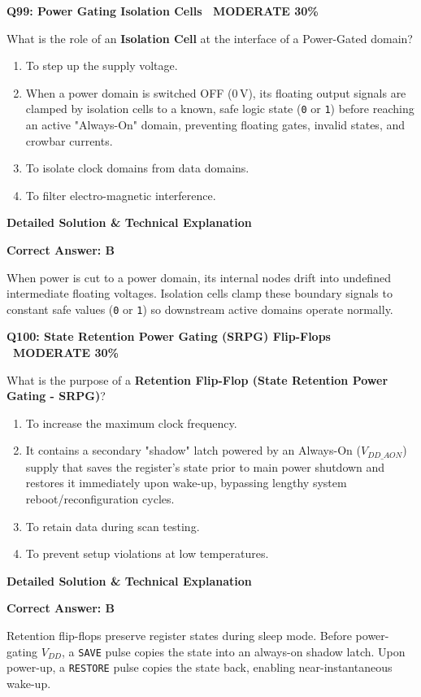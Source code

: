 \documentclass[11pt,a4paper]{article}
\newcommand{\badgemod}{{\color{white}\colorbox{modoran}{\bfseries\sffamily\tiny\ MODERATE 30\%\ }}}
\newenvironment{qbox}[2]{%
  \begin{mdframed}[style=qstyle]%
  {\bfseries\sffamily\color{primaryblue}#1 \hfill #2}\par\vspace{2pt}%
}{%
  \end{mdframed}%
}
\newenvironment{ansbox}{%
  \begin{mdframed}[style=ansstyle]%
  {\bfseries\sffamily\color{ansgreen}\small Detailed Solution \& Technical Explanation}\par\vspace{2pt}\small%
}{%
  \end{mdframed}%
}
\begin{document}
\begin{qbox}{Q99: Power Gating Isolation Cells}{\badgemod}
What is the role of an \textbf{Isolation Cell} at the interface of a Power-Gated domain?
\begin{enumerate}[label=\textbf{\Alph*.}]
  \item To step up the supply voltage.
  \item When a power domain is switched OFF ($0\,\text{V}$), its floating output signals are clamped by isolation cells to a known, safe logic state (\texttt{0} or \texttt{1}) before reaching an active "Always-On" domain, preventing floating gates, invalid states, and crowbar currents.
  \item To isolate clock domains from data domains.
  \item To filter electro-magnetic interference.
\end{enumerate}
\end{qbox}
\begin{ansbox}
\textbf{Correct Answer: B}

When power is cut to a power domain, its internal nodes drift into undefined intermediate floating voltages. Isolation cells clamp these boundary signals to constant safe values (\texttt{0} or \texttt{1}) so downstream active domains operate normally.
\end{ansbox}

\begin{qbox}{Q100: State Retention Power Gating (SRPG) Flip-Flops}{\badgemod}
What is the purpose of a \textbf{Retention Flip-Flop (State Retention Power Gating - SRPG)}?
\begin{enumerate}[label=\textbf{\Alph*.}]
  \item To increase the maximum clock frequency.
  \item It contains a secondary "shadow" latch powered by an Always-On ($V_{DD\_AON}$) supply that saves the register's state prior to main power shutdown and restores it immediately upon wake-up, bypassing lengthy system reboot/reconfiguration cycles.
  \item To retain data during scan testing.
  \item To prevent setup violations at low temperatures.
\end{enumerate}
\end{qbox}
\begin{ansbox}
\textbf{Correct Answer: B}

Retention flip-flops preserve register states during sleep mode. Before power-gating $V_{DD}$, a \texttt{SAVE} pulse copies the state into an always-on shadow latch. Upon power-up, a \texttt{RESTORE} pulse copies the state back, enabling near-instantaneous wake-up.
\end{ansbox}
\end{document}
